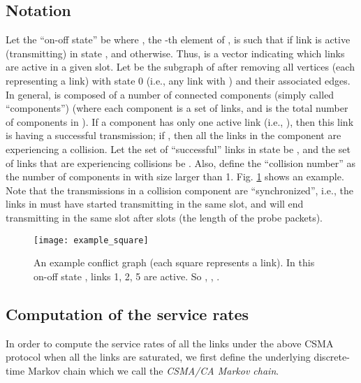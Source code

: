 \documentclass{IEEEtran}
\begin{document}
\subsection{Notation}

Let the {}``on-off state'' be  where ,
the -th element of , is such that  if link 
is active (transmitting) in state , and  otherwise.
Thus,  is a vector indicating which links are active in a given
slot. Let  be the subgraph of  after removing all vertices
(each representing a link) with state 0 (i.e., any link  with
) and their associated edges. In general,  is composed
of a number of connected components (simply called {}``components'')
 (where each component is a set of links,
and  is the total number of components in ). If a component
 has only one active link (i.e., ), then
this link is having a successful transmission; if ,
then all the links in the component are experiencing a collision.
Let the set of {}``successful'' links in state  be ,
and the set of links that are experiencing collisions be .
Also, define the {}``collision number''  as the number of
components in  with size larger than 1. Fig. \ref{fig:Example_c}
shows an example. Note that the transmissions in a collision component
 are {}``synchronized'', i.e., the links in 
must have started transmitting in the same slot, and will end transmitting
in the same slot after  slots (the length of the probe packets).\begin{figure}
\begin{centering}
\texttt{[image: example\_square]}
\par\end{centering}

\caption{\label{fig:Example_c}An example conflict graph (each square represents
a link). In this on-off state , links 1, 2, 5 are active. So ,
, .}



\end{figure}



\subsection{Computation of the service rates}

In order to compute the service rates of all the links under the above
CSMA protocol when all the links are saturated, we first define the
underlying discrete-time Markov chain which we call the \emph{CSMA/CA
Markov chain}.
\end{document}
